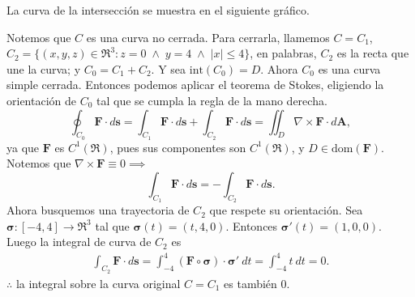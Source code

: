 
\begin{solution} 
La curva de la intersecci\'on se muestra en el siguiente gr\'afico.

\begin{center}
\end{center}

  Notemos que $C$ es una curva no cerrada. Para cerrarla, llamemos $C=C_1$, 
  $C_2=\{(x,y,z)\in\Re^3:z=0\;\land\;y=4\;\land\;|x|\leq4\}$, en palabras, $C_2$ es la recta que une la curva; y $C_0=C_1+C_2$. Y sea $\text{int}(C_0)=D$. Ahora $C_0$ es una curva simple cerrada. Entonces podemos aplicar el teorema de Stokes, eligiendo la orientaci\'on de $C_0$ tal que se cumpla la regla de la mano derecha.
  \[
      \oint_{C_0}\mathbf{F}\cdot d\mathbf{s}= \int_{C_1}\mathbf{F}\cdot d\mathbf{s} + \int_{C_2}\mathbf{F}\cdot d\mathbf{s} = \iint_D \nabla\times\mathbf{F}\cdot d\mathbf{A},
  \]
  ya que $\mathbf{F}$ es $C^1(\Re)$, pues sus componentes son $C^1(\Re)$, y $D\in\text{dom}(\mathbf{F})$.
  Notemos que $\nabla\times\mathbf{F}\equiv0\implies$
  \[
     \int_{C_1}\mathbf{F}\cdot d\mathbf{s} =- \int_{C_2}\mathbf{F}\cdot d\mathbf{s}.
  \]
  Ahora busquemos una trayectoria de $C_2$ que respete su orientaci\'on. Sea $\boldsymbol{\sigma}:[-4,4]\rightarrow\Re^3$
  tal que $\boldsymbol{\sigma}(t)=(t,4,0)$. Entonces $\boldsymbol{\sigma}'(t)=(1,0,0)$. Luego la integral de curva de $C_2$ es
  \begin{gather*}
    \int_{C_2}\mathbf{F}\cdot d\mathbf{s}
    =\int_{-4}^4 (\mathbf{F}\circ\boldsymbol{\sigma})\cdot\boldsymbol{\sigma}'\:dt
    =\int_{-4}^4 t\:dt = 0.
  \end{gather*}
  $\therefore$ la integral sobre la curva original $C=C_1$ es tambi\'en 0.
\end{solution}


